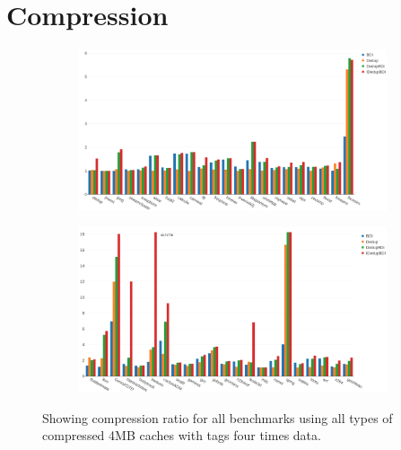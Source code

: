 \section{Compression}
\label{sec:Compression}
\begin{figure}
    \begin{subfigure}{\textwidth}
        \includegraphics[width=\textwidth]{all-compratio1.png}
    \end{subfigure}
    \begin{subfigure}{\textwidth}
        \includegraphics[width=\textwidth]{all-compratio2.png}
    \end{subfigure}
    \caption[All benchmarks: Compression]{Showing compression ratio for all benchmarks using all types of compressed 4MB caches with tags four times data.}
    \label{fig:all_compratio}
\end{figure}
